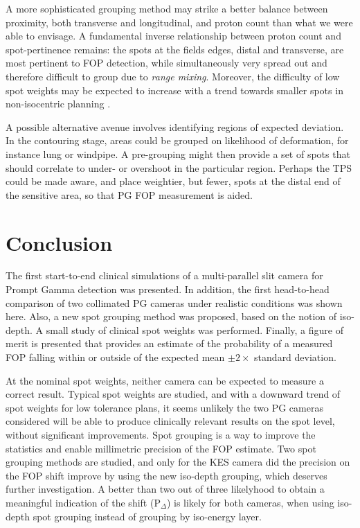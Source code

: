 \documentclass[a4paper,english]{article}
\begin{document}
A more sophisticated grouping method may strike a better balance between proximity, both transverse and longitudinal, and proton count than what we were able to envisage. A fundamental inverse relationship between proton count and spot-pertinence remains: the spots at the fields edges, distal and transverse, are most pertinent to FOP detection, while simultaneously very spread out and therefore difficult to group due to \emph{range mixing}. Moreover, the difficulty of low spot weights may be expected to increase with a trend towards smaller spots in non-isocentric planning \citep{Grevillot2015}.

A possible alternative avenue involves identifying regions of expected deviation. In the contouring stage, areas could be grouped on likelihood of deformation, for instance lung or windpipe. A pre-grouping might then provide a set of spots that should correlate to under- or overshoot in the particular region. Perhaps the TPS could be made aware, and place weightier, but fewer, spots at the distal end of the sensitive area, so that PG FOP measurement is aided.

\section{Conclusion}

The first start-to-end clinical simulations of a multi-parallel slit camera for Prompt Gamma detection was presented. In addition, the first head-to-head comparison of two collimated PG cameras under realistic conditions was shown here. Also, a new spot grouping method was proposed, based on the notion of iso-depth. A small study of clinical spot weights was performed. Finally, a figure of merit is presented that provides an estimate of the probability of a measured FOP falling within or outside of the expected mean $\pm 2\times$ standard deviation.

At the nominal spot weights, neither camera can be expected to measure a correct result. Typical spot weights are studied, and with a downward trend of spot weights for low tolerance plans, it seems unlikely the two PG cameras considered will be able to produce clinically relevant results on the spot level, without significant improvements. Spot grouping is a way to improve the statistics and enable millimetric precision of the FOP estimate. Two spot grouping methods are studied, and only for the KES camera did the precision on the FOP shift improve by using the new iso-depth grouping, which deserves further investigation. A better than two out of three likelyhood to obtain a meaningful indication of the shift (P$_\Delta$) is likely for both cameras, when using iso-depth spot grouping instead of grouping by iso-energy layer.
\end{document}
